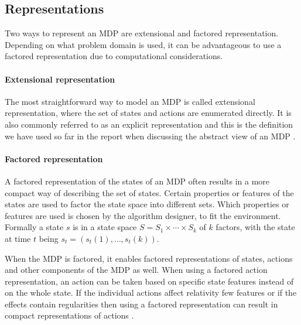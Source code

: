 \subsection{Representations}

Two ways to represent an MDP are extensional and factored representation.
Depending on what problem domain is used, it can be advantageous to use a factored representation due to computational considerations\parencite{dean1999descision}.

\paragraph{Extensional representation}

The most straightforward way to model an MDP is called extensional
representation, where the set of states and actions are enumerated directly. It
is also commonly referred to as an explicit representation and this is the
definition we have used so far in the report when discussing the abstract view
of an MDP \parencite{dean1999descision}.

\paragraph{Factored representation} 
\label{sec:factored_mdp}

A factored representation of the states of an MDP often results in a more
compact way of describing the set of states. Certain properties or features of
the states are used to factor the state space into different sets. Which
properties or features are used is chosen by the algorithm designer, to fit the
environment. Formally a state $s$ is in a state space $S = S_1 \times \cdots
\times S_k$ of $k$ factors, with the state at time $t$ being $s_t = (s_t(1),
\ldots, s_t(k))$.


When the MDP is factored, it enables factored representations of states,
actions and other components of the MDP as well. When using a factored action
representation, an action can be taken based on specific state features instead
of on the whole state. If the individual actions affect relativity few features
or if the effects contain regularities then using a factored representation can
result in compact representations of actions \parencite{dean1999descision}. 
